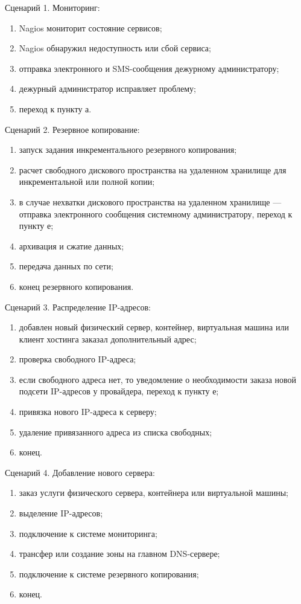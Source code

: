 Сценарий 1. Мониторинг:
\begin{enumerate}
  \item Nagios мониторит состояние сервисов;
  \item Nagios обнаружил недоступность или сбой сервиса;
  \item отправка электронного и SMS-сообщения дежурному администратору;
  \item дежурный администратор исправляет проблему;
  \item переход к пункту а.
\end{enumerate}

Сценарий 2. Резервное копирование:
\begin{enumerate}
  \item запуск задания инкрементального резервного копирования;
  \item расчет свободного дискового пространства на удаленном хранилище для инкрементальной или полной копии;
  \item в случае нехватки дискового пространства на удаленном хранилище --- отправка электронного сообщения системному администратору, переход к пункту е;
  \item архивация и сжатие данных;
  \item передача данных по сети;
  \item конец резервного копирования.
\end{enumerate}

Сценарий 3. Распределение IP-адресов:
\begin{enumerate}
  \item добавлен новый физический сервер, контейнер, виртуальная машина или клиент хостинга заказал дополнительный адрес;
  \item проверка свободного IP-адреса;
  \item если свободного адреса нет, то уведомление о необходимости заказа новой подсети IP-адресов у провайдера, переход к пункту е;
  \item привязка нового IP-адреса к серверу;
  \item удаление привязанного адреса из списка свободных;
  \item конец.
\end{enumerate}

Сценарий 4. Добавление нового сервера:
\begin{enumerate}
  \item заказ услуги физического сервера, контейнера или виртуальной машины;
  \item выделение IP-адресов;
  \item подключение к системе мониторинга;
  \item трансфер или создание зоны на главном DNS-сервере;
  \item подключение к системе резервного копирования;
  \item конец.
\end{enumerate}

